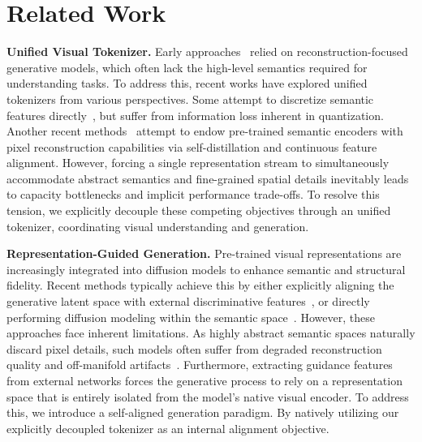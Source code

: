 \documentclass[runningheads]{llncs}
\begin{document}
\section{Related Work}

\noindent\textbf{Unified Visual Tokenizer.}
Early approaches~\cite{van2017neural,zhou2024transfusion} relied on reconstruction-focused generative models, which often lack the high-level semantics required for understanding tasks. To address this, recent works have explored unified tokenizers from various perspectives. Some attempt to discretize semantic features directly~\cite{wu2024vila,qu2025tokenflow,ma2025unitok}, but suffer from information loss inherent in quantization. Another recent methods~\cite{tang2025unilip,yue2025uniflow,sun2024generative,svg,rae} attempt to endow pre-trained semantic encoders with pixel reconstruction capabilities via self-distillation and continuous feature alignment. However, forcing a single representation stream to simultaneously accommodate abstract semantics and fine-grained spatial details inevitably leads to capacity bottlenecks and implicit performance trade-offs. To resolve this tension, we explicitly decouple these competing objectives through an unified tokenizer, coordinating visual understanding and generation.

\noindent\textbf{Representation-Guided Generation.}
Pre-trained visual representations are increasingly integrated into diffusion models to enhance semantic and structural fidelity. Recent methods typically achieve this by either explicitly aligning the generative latent space with external discriminative features~\cite{oquab2023dinov2,yu2025repa}, or directly performing diffusion modeling within the semantic space~\cite{rae}. However, these approaches face inherent limitations. As highly abstract semantic spaces naturally discard pixel details, such models often suffer from degraded reconstruction quality and off-manifold artifacts~\cite{psvae}.
Furthermore, extracting guidance features from external networks forces the generative process to rely on a representation space that is entirely isolated from the model's native visual encoder.
To address this, we introduce a self-aligned generation paradigm. By natively utilizing our explicitly decoupled tokenizer as an internal alignment objective.
\end{document}
